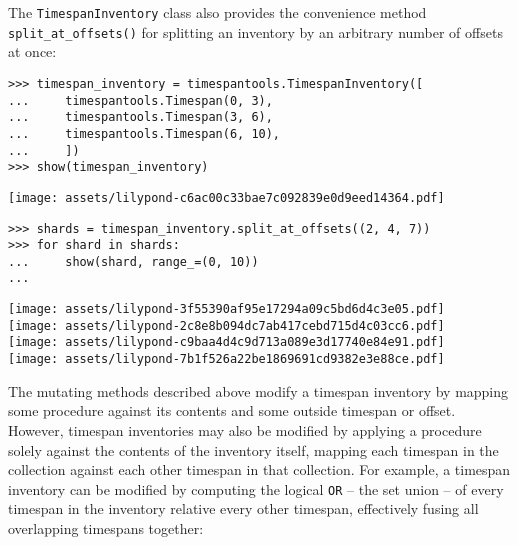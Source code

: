 \noindent The \texttt{TimespanInventory} class also provides the convenience
method \texttt{split\_at\_offsets()} for splitting an inventory by an arbitrary
number of offsets at once:

\begin{comment}
<abjad>
timespan_inventory = timespantools.TimespanInventory([
    timespantools.Timespan(0, 3),
    timespantools.Timespan(3, 6),
    timespantools.Timespan(6, 10),
    ])
show(timespan_inventory)
shards = timespan_inventory.split_at_offsets((2, 4, 7))
for shard in shards:
    show(shard, range_=(0, 10))

</abjad>
\end{comment}

\begin{abjadbookoutput}
\begin{singlespacing}
\vspace{-0.5\baselineskip}
\begin{lstlisting}
>>> timespan_inventory = timespantools.TimespanInventory([
...     timespantools.Timespan(0, 3),
...     timespantools.Timespan(3, 6),
...     timespantools.Timespan(6, 10),
...     ])
>>> show(timespan_inventory)
\end{lstlisting}
\noindent\texttt{[image: assets/lilypond-c6ac00c33bae7c092839e0d9eed14364.pdf]}
\begin{lstlisting}
>>> shards = timespan_inventory.split_at_offsets((2, 4, 7))
>>> for shard in shards:
...     show(shard, range_=(0, 10))
...
\end{lstlisting}
\noindent\texttt{[image: assets/lilypond-3f55390af95e17294a09c5bd6d4c3e05.pdf]}\\
\noindent\texttt{[image: assets/lilypond-2c8e8b094dc7ab417cebd715d4c03cc6.pdf]}\\
\noindent\texttt{[image: assets/lilypond-c9baa4d4c9d713a089e3d17740e84e91.pdf]}\\
\noindent\texttt{[image: assets/lilypond-7b1f526a22be1869691cd9382e3e88ce.pdf]}
\end{singlespacing}
\end{abjadbookoutput}

\noindent The mutating methods described above modify a timespan inventory
by mapping some procedure against its contents and some outside timespan or
offset. However, timespan inventories may also be modified by applying a
procedure solely against the contents of the inventory itself, mapping each
timespan in the collection against each other timespan in that collection.
For example, a timespan inventory can be modified by computing the logical
\texttt{OR} -- the set union -- of every timespan in the inventory relative
every other timespan, effectively fusing all overlapping timespans together:

